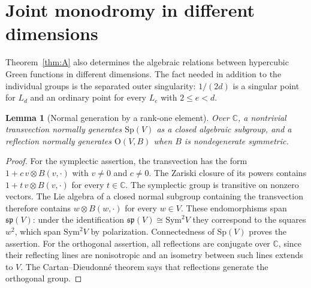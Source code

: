 \documentclass[11pt]{amsart}
\newtheorem{lemma}[thm]{Lemma}
\theoremstyle{definition}
\newcommand{\C}{\mathbb C}
\newcommand{\Sp}{\mathrm{Sp}}
\newcommand{\Ort}{\mathrm{O}}
\newcommand{\Sym}{\mathrm{Sym}}
\begin{document}
\section{Joint monodromy in different dimensions}\label{sec:joint-hypercubic}
Theorem~\ref{thm:A} also determines the algebraic relations between
hypercubic Green functions in different dimensions.  The fact needed in
addition to the individual groups is the separated outer singularity:
$1/(2d)$ is a singular point for $L_d$ and an ordinary point for every
$L_e$ with $2\le e<d$.

\begin{lemma}[Normal generation by a rank-one element]\label{lem:normal-rankone}
Over $\C$, a nontrivial transvection normally generates $\Sp(V)$ as a
closed algebraic subgroup, and a reflection normally generates
$\Ort(V,B)$ when $B$ is nondegenerate symmetric.
\end{lemma}
\begin{proof}
For the symplectic assertion, the transvection has the form
$1+c\,v\otimes B(v,\cdot)$ with $v\ne0$ and $c\ne0$.
The Zariski closure of its powers contains
$1+t\,v\otimes B(v,\cdot)$ for every $t\in\C$.
The symplectic group is transitive on nonzero vectors.  The Lie algebra
of a closed normal subgroup containing the transvection therefore
contains $w\otimes B(w,\cdot)$ for every $w\in V$.
These endomorphisms span $\mathfrak{sp}(V)$: under the identification
$\mathfrak{sp}(V)\cong\Sym^2 V$ they correspond to the squares $w^2$,
which span $\Sym^2V$ by polarization.  Connectedness of $\Sp(V)$ proves
the assertion.  For the orthogonal assertion, all reflections are
conjugate over $\C$, since their reflecting lines are nonisotropic and
an isometry between such lines extends to $V$.  The Cartan--Dieudonn\'e
theorem says that reflections generate the orthogonal group.
\end{proof}
\end{document}
